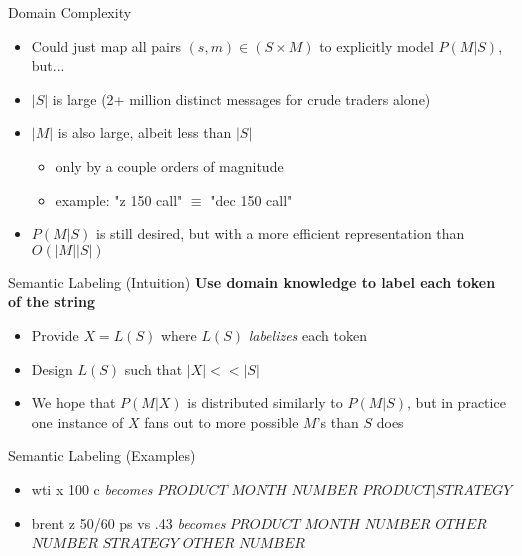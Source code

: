 \documentclass{beamer}
\begin{document}
\begin{frame}{Domain Complexity}
\begin{itemize}
\item Could just map all pairs $(s,m) \in (S \times M)$ to explicitly model $P(M|S)$, but...
\pause
\item $|S|$ is large (2+ million distinct messages for crude traders alone) 
\pause
\item $|M|$ is also large, albeit less than $|S|$ 
\begin{itemize}
\item only by a couple orders of magnitude  
\item example: "z 150 call" $\equiv$ "dec 150 call"\newline
\end{itemize}
\pause
\item $P(M|S)$ is still desired, but with a more efficient representation than $O(|M||S|)$
\end{itemize}
\end{frame}

\begin{frame}{Semantic Labeling (Intuition)}
\textbf{Use domain knowledge to label each token of the string}\newline
\begin{itemize}
\pause
\item Provide $X = L(S)$ where $L(S)$ \textit{labelizes} each token
\item Design $L(S)$ such that $|X| << |S|$\newline
\pause
\item We hope that $P(M|X)$ is distributed similarly to $P(M|S)$, but in practice one instance of $X$ fans out to more possible $M$'s than $S$ does
\end{itemize}
\end{frame}


\begin{frame}{Semantic Labeling (Examples)}
\begin{itemize}
\item wti x 100 c \newline\newline \textit{becomes} \newline
\newline$PRODUCT$ $MONTH$ $NUMBER$ $PRODUCT|STRATEGY$\newline
\pause
\item brent z 50/60 ps vs .43 \newline\newline \textit{becomes} \newline
\newline$PRODUCT$ $MONTH$ $NUMBER$ $OTHER$ $NUMBER$ $STRATEGY$ $OTHER$ $NUMBER$
\end{itemize}
\end{frame}
\end{document}
